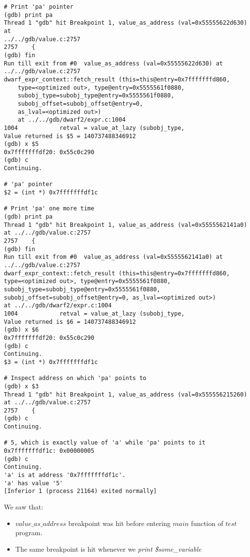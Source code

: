 \documentclass{report}
\begin{document}
\begin{verbatim}
# Print 'pa' pointer
(gdb) print pa
Thread 1 "gdb" hit Breakpoint 1, value_as_address (val=0x55555622d630) at 
../../gdb/value.c:2757
2757	{
(gdb) fin
Run till exit from #0  value_as_address (val=0x55555622d630) at 
../../gdb/value.c:2757
dwarf_expr_context::fetch_result (this=this@entry=0x7fffffffd860, 
    type=<optimized out>, type@entry=0x5555561f0880, 
    subobj_type=subobj_type@entry=0x5555561f0880, 
    subobj_offset=subobj_offset@entry=0, 
    as_lval=<optimized out>)
    at ../../gdb/dwarf2/expr.c:1004
1004		    retval = value_at_lazy (subobj_type,
Value returned is $5 = 140737488346912
(gdb) x $5
0x7fffffffdf20:	0x55c0c290
(gdb) c
Continuing.

# 'pa' pointer
$2 = (int *) 0x7fffffffdf1c

# Print 'pa' one more time
(gdb) print pa
Thread 1 "gdb" hit Breakpoint 1, value_as_address (val=0x5555562141a0) 
at ../../gdb/value.c:2757
2757	{
(gdb) fin
Run till exit from #0  value_as_address (val=0x5555562141a0) at 
../../gdb/value.c:2757
dwarf_expr_context::fetch_result (this=this@entry=0x7fffffffd860, 
type=<optimized out>, type@entry=0x5555561f0880, 
subobj_type=subobj_type@entry=0x5555561f0880, 
subobj_offset=subobj_offset@entry=0, as_lval=<optimized out>)
at ../../gdb/dwarf2/expr.c:1004
1004		    retval = value_at_lazy (subobj_type,
Value returned is $6 = 140737488346912
(gdb) x $6
0x7fffffffdf20:	0x55c0c290
(gdb) c
Continuing.
$3 = (int *) 0x7fffffffdf1c

# Inspect address on which 'pa' points to
(gdb) x $3
Thread 1 "gdb" hit Breakpoint 1, value_as_address (val=0x555556215260) 
at ../../gdb/value.c:2757
2757	{
(gdb) c
Continuing.

# 5, which is exactly value of 'a' while 'pa' points to it
0x7fffffffdf1c:	0x00000005
(gdb) c
Continuing.
'a' is at address '0x7fffffffdf1c'.
'a' has value '5'
[Inferior 1 (process 21164) exited normally]

\end{verbatim}
We saw that:
\begin{itemize}
\item $value\_as\_address$ breakpoint was hit before entering $main$ function of $test$ program.
\item The same breakpoint is hit whenever we \textit{print \$some\_variable}
\end{itemize}
\end{document}
